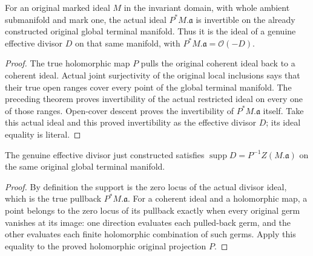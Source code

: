 \begin{theorem}
\label{hir:original-global-terminal-true-ideal-invertible}
\leanok
{}
For an original marked ideal $M$ in the invariant domain, with whole
ambient submanifold and mark one, the actual ideal $P^*M.\mathfrak a$
is invertible on the already constructed original global terminal
manifold.  Thus it is the ideal of a genuine effective divisor $D$ on
that same manifold, with $P^*M.\mathfrak a=\mathcal O(-D)$.
\end{theorem}
\begin{proof}
The true holomorphic map $P$ pulls the original coherent ideal back to a
coherent ideal.  Actual joint surjectivity of the original local
inclusions says that their true open ranges cover every point of the
global terminal manifold.  The preceding theorem proves invertibility
of the actual restricted ideal on every one of those ranges.  Open-cover
descent proves the invertibility of $P^*M.\mathfrak a$ itself.  Take this
actual ideal and this proved invertibility as the effective divisor $D$;
its ideal equality is literal.
\end{proof}

\begin{theorem}
\label{hir:original-global-principalization-true-support}
\leanok
{}
The genuine effective divisor just constructed satisfies
$\operatorname{supp}D=P^{-1}Z(M.\mathfrak a)$ on the same original
global terminal manifold.
\end{theorem}
\begin{proof}
By definition the support is the zero locus of the actual divisor ideal,
which is the true pullback $P^*M.\mathfrak a$.  For a coherent ideal and
a holomorphic map, a point belongs to the zero locus of its pullback
exactly when every original germ vanishes at its image: one direction
evaluates each pulled-back germ, and the other evaluates each finite
holomorphic combination of such germs.  Apply this equality to the
proved holomorphic original projection $P$.
\end{proof}
